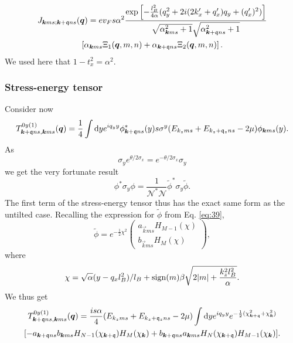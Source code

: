 \begin{multline}
  J_{\bm{k} m s; \bm{k} + \mathfrak{q} n s} (\bm{q}) =
  e v_F s \alpha^2
  \frac{
    \exp \left[
      -\frac{l_{B}^2}{4 \alpha } (q_{y}^2 + 2i (2 k' _x + q' _x) q_{y} + (q'_x)^2 )
    \right]
  }{
    \sqrt{\alpha_{\bm{k} m s}^2 + 1} \sqrt{\alpha _{\bm{k}+\mathfrak{q} n s}^2 + 1}
  }\\
  \left[
     \alpha_{\bm{k} m s} \Xi_1(\bm{q}, m, n) + \alpha_{\bm{k} + \mathfrak{q} n s} \Xi_2(\bm{q}, m, n)
  \right].
\end{multline}
We used here that \( 1 - t_x^2 = \alpha^2 \).

\subsubsection{Stress-energy tensor}
Consider now
\begin{equation}
  \label{eq:86}
  T_{\bm{k} + \mathfrak{q} n s, \bm{k} m s}^{0y(1)} (\bm{q}) =
  \frac{1}{4}
  \int \mathrm{d} y
  e^{i q_{y} y}
  \phi ^{*}_{\bm{k} + \mathfrak{q} n s}(y) s \sigma ^{y}
  (E_{k_z m  s} + E_{k_z+\mathfrak{q}_z n s} - 2 \mu)
  \phi _{\bm{k} m s} (y).
\end{equation}
As
\begin{equation}
  \label{eq:87}
  \sigma _{y} e^{\theta /2 \sigma _{x}} = e^{-\theta /2 \sigma _{x}} \sigma _{y}
\end{equation}
we get the very fortunate result
\begin{equation}
  \label{eq:88}
  \phi^{*} \sigma _{y} \phi = \frac{1}{\mathcal{N}^{*} \mathcal{N}} \tilde{\phi}^{*} \sigma _{y} \tilde{\phi}.
\end{equation}
The first term of the stress-energy tensor thus has the exact same form as the untilted case.
Recalling the expression for \(\tilde{\phi}\) from Eq. \eqref{eq:39},
\[
  \tilde{\phi} = e^{-\frac{1}{2} \chi ^2}
  \begin{pmatrix}
    a_{\vec{k} m s} H_{M-1} (\chi)\\
    b_{\vec{k} m s} H_{M} (\chi)
  \end{pmatrix},
\]
where
\[
\chi = \sqrt{\alpha} (y - q_{x} l_{B}^2 ) /l_{B} + \operatorname{sign}(m) \beta \sqrt{2 |m| + \frac{k_{z}^2 l_{B}^2}{\alpha }}.
\]
We thus get
\begin{multline}
  \label{eq:89}
  T_{\vec{k}+\qvec{q} ns, \vec{k} m s}^{0y (1)} (\vec{q}) =
  \frac{is \alpha}{4} (E_{k_z m s} + E_{k_z + \qvec{q}_z n s} - 2 \mu)
  \int \mathrm{d} y
  e^{i q_{y} y}
  e^{-\frac{1}{2} (\chi_{\vec{k}+\qvec{q}}^2 + \chi_{\vec{k}} ^2) }\\
  [
  -a_{\vec{k} + \qvec{q} ns} b_{\vec{k} m s} H_{N-1} (\chi_{\vec{k} + \qvec{q}}) H_{M} (\chi_{\vec{k}})
  + b_{\vec{k} + \qvec{q} n s} a_{\vec{k} ms} H_{N}(\chi_{\vec{k} + \qvec{q}}) H_{M-1} (\chi_{\vec{k}})
  ].
\end{multline}
